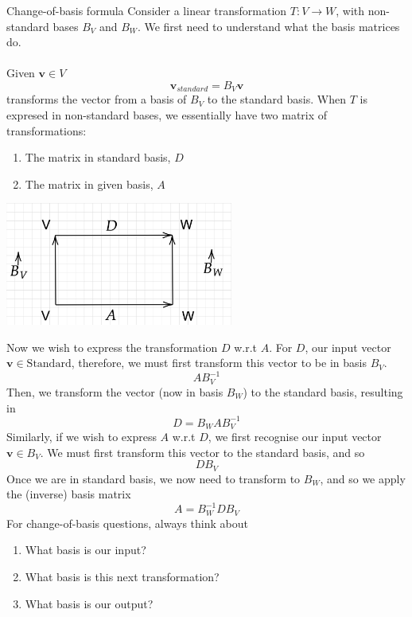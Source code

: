 \documentclass[journal, letterpaper]{IEEEtran}
\begin{document}
    \begin{myboxr}{Change-of-basis formula} \newline
        Consider a linear transformation $T : V \to W$, with non-standard bases $B_V$ and $B_W$. We first need to understand what the basis matrices do.
        \\ \\
        Given $\mathbf{v} \in V$
        $$ \mathbf{v}_{standard} = B_V \mathbf{v}$$
        transforms the vector from a basis of $B_V$ to the standard basis. When $T$ is expresed in non-standard bases, we essentially have two matrix of transformations:
        \begin{enumerate}
            \item The matrix in standard basis, $D$
            \item The matrix in given basis, $A$
        \end{enumerate}
        \begin{center}
            \includegraphics[width=7.5cm]{./diagram.png}
        \end{center}
        Now we wish to express the transformation $D$ w.r.t $A$. For $D$, our input vector $\mathbf{v} \in \text{Standard}$, therefore, we must first transform this vector to be in basis $B_V$.
        $$ AB_V^{-1}$$
        Then, we transform the vector (now in basis $B_W$) to the standard basis, resulting in 
        $$ D = B_WAB_V^{-1}$$
        Similarly, if we wish to express $A$ w.r.t $D$, we first recognise our input vector $\mathbf{v} \in B_V$. We must first transform this vector to the standard basis, and so
        $$ DB_V$$
        Once we are in standard basis, we now need to transform to $B_W$, and so we apply the (inverse) basis matrix
        $$ A = B_W^{-1}DB_V$$
        For change-of-basis questions, always think about
        \begin{enumerate}
            \item What basis is our input?
            \item What basis is this next transformation?
            \item What basis is our output?
        \end{enumerate}
    \end{myboxr}
\end{document}
